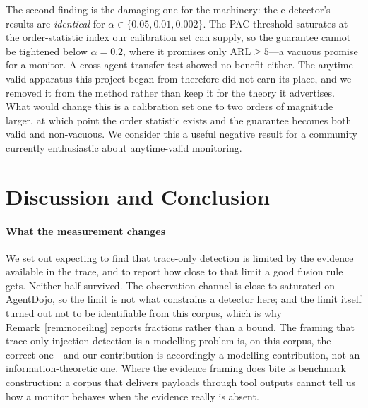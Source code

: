 \documentclass[preprint,12pt,number]{elsarticle}
\theoremstyle{definition}
\begin{document}
The second finding is the damaging one for the machinery: the e-detector's results
are \emph{identical} for $\alpha \in \{0.05, 0.01, 0.002\}$. The PAC threshold
saturates at the order-statistic index our calibration set can supply, so the
guarantee cannot be tightened below $\alpha = 0.2$, where it promises only
$\mathrm{ARL} \ge 5$---a vacuous promise for a monitor. A cross-agent transfer test
showed no benefit either. The anytime-valid apparatus this project began from
therefore did not earn its place, and we removed it from the method rather than
keep it for the theory it advertises. What would change this is a calibration set
one to two orders of magnitude larger, at which point the order statistic exists
and the guarantee becomes both valid and non-vacuous. We consider this a useful negative
result for a community currently enthusiastic about anytime-valid monitoring.

\section{Discussion and Conclusion}\label{sec:discussion}

\paragraph{What the measurement changes} We set out expecting to find that
trace-only detection is limited by the evidence available in the trace, and to
report how close to that limit a good fusion rule gets. Neither half survived. The
observation channel is close to saturated on AgentDojo, so the limit is not what
constrains a detector here; and the limit itself turned out not to be identifiable
from this corpus, which is why Remark~\ref{rem:noceiling} reports fractions rather
than a bound. The framing that trace-only injection detection is a modelling
problem is, on this corpus, the correct one---and our contribution is accordingly a
modelling contribution, not an information-theoretic one. Where the evidence framing
does bite is benchmark construction: a corpus that delivers payloads through tool
outputs cannot tell us how a monitor behaves when the evidence really is absent.
\end{document}
